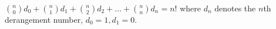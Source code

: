 \documentclass{book}
\begin{document}
\setcounter{project}{107}
\addtocounter{project}{-1}
\begin{activity}[]\label{activity-100}
\hypertarget{p-772}{}%
\(\binom{n}{0} d_{0} + \binom{n}{1} d_{1} + \binom{n}{2} d_{2} + \ldots + \binom{n}{n} d_{n} = n!\) where \(d_{n}\) denotes the \(n\)th derangement number, \(d_{0} = 1,d_{1} = 0\).%
\end{activity}
\end{document}
